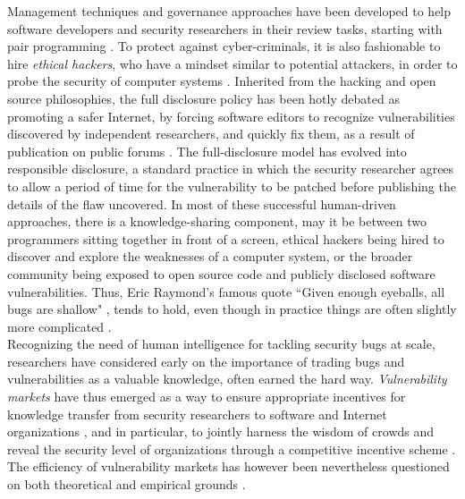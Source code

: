 Management techniques and governance approaches have been developed to help software developers and security researchers in their review tasks, starting with pair programming \cite{hulkko2005multiple}. To protect against cyber-criminals, it is also fashionable to hire {\it ethical hackers}, who have a mindset similar to potential attackers, in order to probe the security of computer systems \cite{smith2002ethical,saleem2006ethical,bishop2007penetration}. Inherited from the hacking and open source philosophies, the full disclosure policy has been hotly debated as promoting a safer Internet, by forcing software editors to recognize vulnerabilities discovered by independent researchers, and quickly fix them, as a result of publication on public forums \cite{arora2008optimal}. The full-disclosure model has evolved into responsible disclosure, a standard practice in which the security researcher agrees to allow a period of time for the vulnerability to be patched before publishing the details of the flaw uncovered. In most of these successful human-driven approaches, there is a knowledge-sharing component, may it be between two programmers sitting together in front of a screen, ethical hackers being hired to discover and explore the weaknesses of a computer system, or the broader community being exposed to open source code and publicly disclosed software vulnerabilities. Thus, Eric Raymond's famous quote ``Given enough eyeballs, all bugs are shallow" \cite{raymond1999cathedral}, tends to hold, even though in practice things are often slightly more complicated \cite{hafiz2015game}.\\

Recognizing the need of human intelligence for tackling security bugs at scale, researchers have considered early on the importance of trading bugs and vulnerabilities as a valuable knowledge, often earned the hard way. {\it Vulnerability markets} have thus emerged as a way to ensure appropriate incentives for knowledge transfer from security researchers to software and Internet organizations \cite{camp2004pricing}, and in particular, to jointly harness the wisdom of crowds and reveal the security level of organizations through a competitive incentive scheme \cite{schechter2002buy}. The efficiency of vulnerability markets has however been nevertheless questioned on both theoretical \cite{kannan2005market,mckinney2007vulnerability} and empirical grounds \cite{ransbotham2008markets,algarni2014software}.\\

